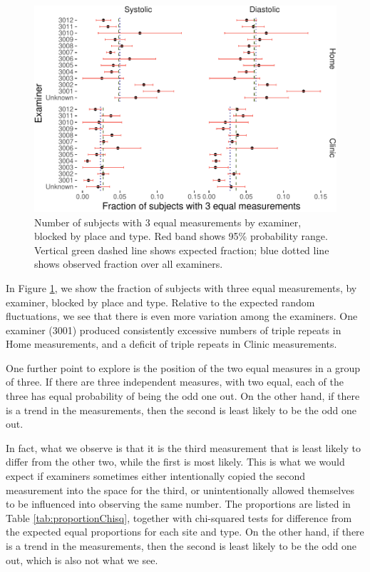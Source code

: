 \documentclass[
]{article}
\begin{document}
\begin{figure}
\centering
\includegraphics{Appendix_files/figure-latex/examinerPlot3-1.pdf}
\caption{\label{fig:examinerPlot3}Number of subjects with 3 equal measurements by examiner, blocked by place and type. Red band shows 95\% probability range. Vertical green dashed line shows expected fraction; blue dotted line shows observed fraction over all examiners.}
\end{figure}

In Figure \ref{fig:examinerPlot3}, we show the fraction of subjects with three equal measurements, by examiner, blocked by place and type.
Relative to the expected random fluctuations, we see that there is even more variation among the examiners.
One examiner (3001) produced consistently excessive numbers of triple repeats in Home measurements, and a deficit of triple repeats in Clinic measurements.

One further point to explore is the position of the two equal measures in a group of three.
If there are three independent measures, with two equal, each of the three has equal probability of being the odd one out.
On the other hand, if there is a trend in the measurements, then the second is least likely to be the odd one out.

In fact, what we observe is that it is the third measurement that is least likely to differ from the other two, while the first is most likely.
This is what we would expect if examiners sometimes either intentionally copied the second measurement into the space for the third, or unintentionally allowed themselves to be influenced into observing the same number.
The proportions are listed in Table \ref{tab:proportionChisq}, together with chi-squared tests for difference from the expected equal proportions for each site and type.
On the other hand, if there is a trend in the measurements, then the second is least likely to be the odd one out, which is also not what we see.
\end{document}
